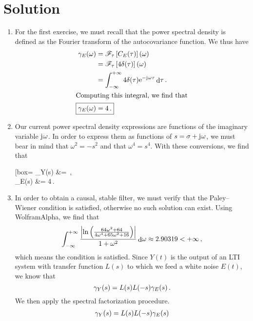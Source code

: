 \documentclass[11pt]{article}
\newcommand{\imagj}{\mathrm{j}\mkern1mu} %
\newcommand{\abs}[1]{\left\lvert#1\right\lvert}
\DeclareMathOperator{\newdiff}{d} %
\newcommand{\dif}{\newdiff\!}
\newcommand{\e}{\mathrm{e}}
\newcommand{\cov}{C}
\newcommand*\widebox[1]{\boxed{#1}}
\begin{document}
\section{Solution}
\begin{enumerate}
	\item For the first exercise,
	we must recall that the power spectral density is defined as the Fourier transform of the autocovariance function.
	We thus have
	\begin{align}
	\gamma_E(\omega) &= \mathscr{F}_\tau \left[\cov_E(\tau) \right](\omega) \notag \\
	&= \mathscr{F}_\tau \left[4 \delta(\tau)\right](\omega) \notag \\
	&= \int_{-\infty}^{+\infty} 4\delta(\tau) \e^{-\imagj \omega \tau} \dif \tau \notag \,.\\
	\intertext{Computing this integral, we find that}
	\Aboxed{\gamma_E(\omega) &= 4\,.}
	\end{align}
	\item Our current power spectral density expressions are functions of the imaginary variable \(\imagj \omega\).
	In order to express them as functions of \(s = \sigma + \imagj \omega\),
	we must bear in mind that \(\omega^2 = -s^2\) and that \(\omega^4 = s^4\).
	With these conversions, we find that
	\begin{empheq}[box=\widebox]{align}
	\gamma_Y(s) &= \,,\\
	\gamma_E(s) &= 4\,.
	\end{empheq}
	\item In order to obtain a causal, stable filter, we must verify that the Paley--Wiener condition is satisfied, otherwise no such solution can exist.
	Using \textcolor{wolframred}{Wolfram}\textcolor{wolframorange}{Alpha}, we find that 
	\begin{equation}
	\int_{-\infty}^{+\infty} \frac{\abs{\ln\left(\frac{64 \omega^2 + 64}{4 \omega^4 + 65 \omega^2 + 16}\right)}}{1 + \omega^2} \dif \omega \approx 2.90319 < +\infty\,,\notag
	\end{equation}
	which means the condition is satisfied.
	Since \(Y(t)\) is the output of an LTI system with transfer function \(L(s)\)
	to which we feed a white noise \(E(t)\),
	we know that
	\begin{equation}
	\gamma_Y(s) = L(s) L(-s) \gamma_E(s)\,.\notag
	\end{equation}
	We then apply the spectral factorization procedure.
	\begin{align}
	\gamma_Y(s) &= L(s) L(-s) \gamma_E(s)\notag\\

\end{align}
\end{enumerate}
\end{document}
